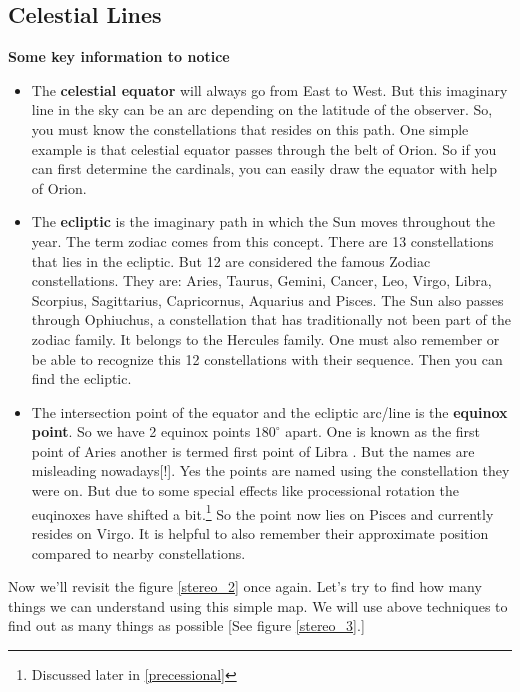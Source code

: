 \documentclass[a4paper,12pt]{extarticle}
\begin{document}
\subsection*{Celestial Lines}
\textbf{Some key information to notice}
\begin{itemize}
	\itemsep0em 
	\renewcommand{\labelitemi}{\textcolor{orange}{\(\bigstar\)}}
    \item The \textbf{celestial equator} will always go from East to West. But this imaginary line in the sky can be an arc depending on the latitude of the observer. So, you must know the constellations that resides on this path. One simple example is that celestial equator passes through the belt of Orion. So if you can first determine the cardinals, you can easily draw the equator with help of Orion.
    \item The \textbf{ecliptic} is the imaginary path in which the Sun moves throughout the year. The term zodiac comes from this concept. There are 13 constellations that lies in the ecliptic. But 12 are considered the famous Zodiac constellations. They are: Aries, Taurus, Gemini, Cancer, Leo, Virgo, Libra, Scorpius, Sagittarius, Capricornus, Aquarius and Pisces. The Sun also passes through Ophiuchus, a constellation that has traditionally not been part of the zodiac family. It belongs to the Hercules family. One must also remember or be able to recognize this 12 constellations with their sequence. Then you can find the ecliptic.
    \item The intersection point of the equator and the ecliptic arc/line is the \textbf{equinox point}. So we have 2 equinox points $180^\circ$ apart. One is known as the first point of Aries \aries \; another is termed first point of Libra \libra. But the names are misleading nowadays[!]. Yes the points are named using the constellation they were on. But due to some special effects like processional rotation the euqinoxes have shifted a bit.\footnote{Discussed later in \ref{precessional}} So the \aries \; point now lies on Pisces and \libra \; currently resides on Virgo. It is helpful to also remember their approximate position compared to nearby constellations.
\end{itemize}



Now we'll revisit the figure \ref{stereo_2} once again. Let's try to find how many things we can understand using this simple map. We will use above techniques to find out as many things as possible [See figure \ref{stereo_3}.]
\end{document}
